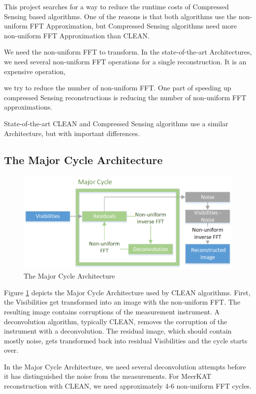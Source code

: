 This project searches for a way to reduce the runtime costs of Compressed Sensing based algorithms.
 One of the reasons is that both algorithms use the non-uniform FFT Approximation, but Compressed Sensing algorithms need more non-uniform FFT Approximation than CLEAN.

We need the non-uniform FFT to transform. In the state-of-the-art Architectures, we need several non-uniform FFT operations for a single reconstruction. It is an expensive operation, 

we try to reduce the number of non-uniform FFT. One part of speeding up compressed Sensing reconstructions is reducing the number of non-uniform FFT approximations.

State-of-the-art CLEAN and Compressed Sensing algorithms use a similar Architecture, but with important differences.


\subsection{The Major Cycle Architecture}

\begin{figure}[h]
	\centering
	\includegraphics[width=0.80\linewidth]{./chapters/02.hypo/Major-Minor.png}
	\caption{The Major Cycle Architecture}
	\label{hypo:major}
\end{figure}


Figure \ref{hypo:major} depicts the Major Cycle Architecture used by CLEAN algorithms. First, the Visibilities get transformed into an image with the non-uniform FFT. The resulting image contains corruptions of the measurement instrument. A deconvolution algorithm, typically CLEAN, removes the corruption of the instrument with a deconvolution. The residual image, which should contain mostly noise, gets transformed back into residual Visibilities and the cycle starts over.

In the Major Cycle Architecture, we need several deconvolution attempts before it has distinguished the noise from the measurements. For MeerKAT reconstruction with CLEAN, we need approximately 4-6 non-uniform FFT cycles. 

